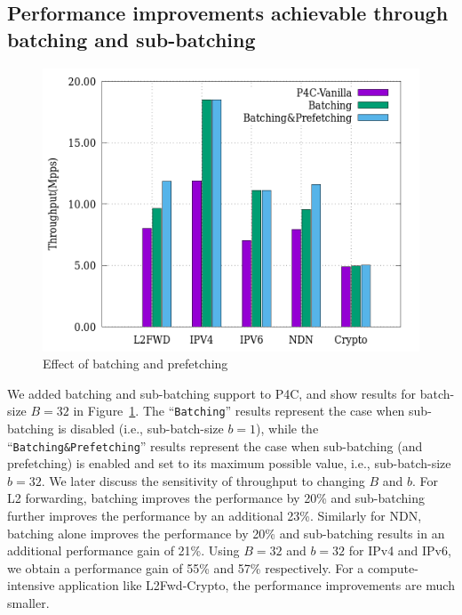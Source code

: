 \subsection{Performance improvements achievable through batching and sub-batching}
\label{batchingandprefetching}
\begin{figure}[ht]
\includegraphics[width = \linewidth]{Figures/effectofbatching.png}
\caption{Effect of batching and prefetching}
\label{fig:batchingandprefetchingfigure}
\end{figure}
We added batching and sub-batching support to P4C, and show results for batch-size $B=32$
in Figure~\ref{fig:batchingandprefetchingfigure}. The ``{\tt Batching}'' results represent the case when sub-batching
is disabled (i.e., sub-batch-size $b=1$), while the ``{\tt Batching\&Prefetching}'' results represent the case
when sub-batching (and prefetching) is enabled and set to its maximum possible value, i.e., sub-batch-size $b=32$.
We later discuss the sensitivity of
throughput to changing $B$ and $b$.
For L2 forwarding, batching improves the performance by 20\% and sub-batching further improves the performance by an additional 23\%. Similarly
for NDN, batching alone improves the performance by 20\% and sub-batching results in an additional performance gain of 21\%.
Using $B=32$ and $b=32$ for IPv4 and IPv6, we obtain a performance gain of 55\% and 57\% respectively.
For a compute-intensive application like L2Fwd-Crypto, the performance improvements are much smaller.

